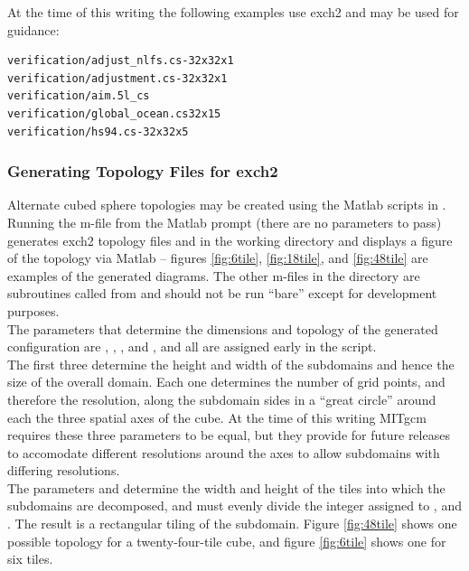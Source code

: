 At the time of this writing the following examples use exch2 and may
be used for guidance:

\begin{verbatim}
verification/adjust_nlfs.cs-32x32x1
verification/adjustment.cs-32x32x1 
verification/aim.5l_cs
verification/global_ocean.cs32x15
verification/hs94.cs-32x32x5
\end{verbatim}




\subsubsection{Generating Topology Files for exch2}
\label{sec:topogen}

Alternate cubed sphere topologies may be created using the Matlab
scripts in . Running the
m-file
from the Matlab prompt (there are no parameters to pass) generates
exch2 topology files  and
 in the working directory and displays a figure of
the topology via Matlab -- figures \ref{fig:6tile}, \ref{fig:18tile}, 
and \ref{fig:48tile} are examples of the generated diagrams.  The other 
m-files in the directory are
subroutines called from  and should not be run ``bare'' except
for development purposes. \\

The parameters that determine the dimensions and topology of the
generated configuration are , , ,
 and , and all are assigned early in the script. \\

The first three determine the height and width of the subdomains and
hence the size of the overall domain.  Each one determines the number
of grid points, and therefore the resolution, along the subdomain
sides in a ``great circle'' around each the three spatial axes of the cube.  At the time
of this writing MITgcm requires these three parameters to be equal,
but they provide for future releases  to accomodate different
resolutions around the axes to allow subdomains with differing resolutions.\\

The parameters  and  determine the width and height of
the tiles into which the subdomains are decomposed, and must evenly
divide the integer assigned to ,  and .
The result is a rectangular tiling of the subdomain.  Figure
\ref{fig:48tile} shows one possible topology for a twenty-four-tile
cube, and figure \ref{fig:6tile} shows one for six tiles. \\

